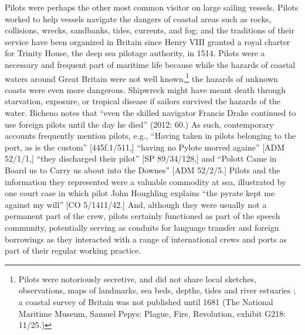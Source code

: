   Pilots were perhaps the other most common visitor on large sailing vessels. Pilots worked to help vessels navigate the dangers of coastal areas such as rocks, collisions, wrecks, sandbanks, tides, currents, and fog; and the traditions of their service have been organized in Britain since Henry VIII granted a royal charter for Trinity House, the deep sea pilotage authority, in 1514. Pilots were a necessary and frequent part of maritime life because while the hazards of coastal waters around Great Britain were not well known,\footnote{Pilots were notoriously secretive, and did not share local sketches, observations, maps of landmarks, sea beds, depths, tides and river estuaries \citep[64]{Bicheno2012}; a coastal survey of Britain was not published until 1681 (The National Maritime Museum, Samuel Pepys: Plague, Fire, Revolution, exhibit G218: 11/25.)}  the hazards of unknown coasts were even more dangerous. Shipwreck might have meant death through starvation, exposure, or tropical disease if sailors survived the hazards of the water. Bicheno notes that “even the skilled navigator Francis Drake continued to use foreign pilots until the day he died” (2012: 60.) As such, contemporary accounts frequently mention pilots, e.g., “Having taken in pilots belonging to the port, as is the custom” [445f.1/511,] “having no Pylote morred againe” [ADM 52/1/1,] “they discharged their pilot” [SP 89/34/128,] and “Polott Came in Board us to Carry us about into the Downes” [ADM 52/2/5.] Pilots and the information they represented were a valuable commodity at sea, illustrated by one court case in which pilot John Houghling explains “the pyrate kept me against my will” [CO 5/1411/42.] And, although they were usually not a permanent part of the crew, pilots certainly functioned as part of the speech community, potentially serving as conduits for language transfer and foreign borrowings as they interacted with a range of international crews and ports as part of their regular working practice. 

